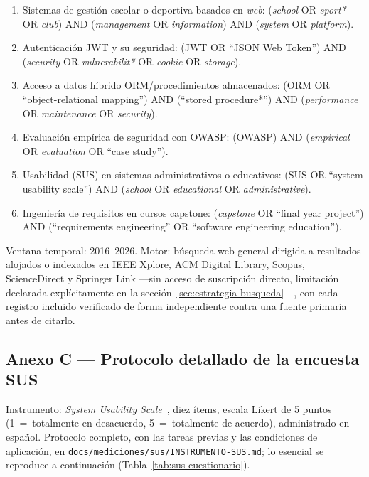 \documentclass[11pt,a4paper]{article}
\newcommand{\ruta}[1]{\texttt{\footnotesize #1}}
\begin{document}
\begin{enumerate}[leftmargin=*, itemsep=2pt]
  \item Sistemas de gestión escolar o deportiva basados en \emph{web}:
    (\emph{school} OR \emph{sport*} OR \emph{club}) AND (\emph{management}
    OR \emph{information}) AND (\emph{system} OR \emph{platform}).
  \item Autenticación JWT y su seguridad: (JWT OR ``JSON Web Token'') AND
    (\emph{security} OR \emph{vulnerabilit*} OR \emph{cookie} OR
    \emph{storage}).
  \item Acceso a datos híbrido ORM/procedimientos almacenados: (ORM OR
    ``object-relational mapping'') AND (``stored procedure*'') AND
    (\emph{performance} OR \emph{maintenance} OR \emph{security}).
  \item Evaluación empírica de seguridad con OWASP: (OWASP) AND
    (\emph{empirical} OR \emph{evaluation} OR ``case study'').
  \item Usabilidad (SUS) en sistemas administrativos o educativos: (SUS OR
    ``system usability scale'') AND (\emph{school} OR \emph{educational}
    OR \emph{administrative}).
  \item Ingeniería de requisitos en cursos capstone: (\emph{capstone} OR
    ``final year project'') AND (``requirements engineering'' OR
    ``software engineering education'').
\end{enumerate}

Ventana temporal: 2016--2026. Motor: búsqueda web general dirigida a
resultados alojados o indexados en IEEE Xplore, ACM Digital Library,
Scopus, ScienceDirect y Springer Link —sin acceso de suscripción
directo, limitación declarada explícitamente en
la sección~\ref{sec:estrategia-busqueda}—, con cada registro incluido
verificado de forma independiente contra una fuente primaria antes de
citarlo.

\subsection*{Anexo C --- Protocolo detallado de la encuesta SUS}

Instrumento: \emph{System Usability Scale}~\cite{brooke1996}, diez
ítems, escala Likert de 5 puntos (1~=~totalmente en desacuerdo,
5~=~totalmente de acuerdo), administrado en español. Protocolo
completo, con las tareas previas y las condiciones de aplicación, en
\ruta{docs/mediciones/sus/INSTRUMENTO-SUS.md}; lo esencial se
reproduce a continuación (Tabla~\ref{tab:sus-cuestionario}).
\end{document}
